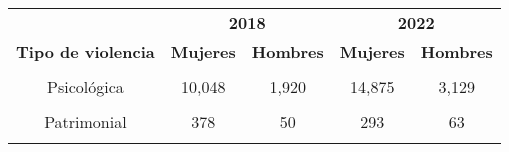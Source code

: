 \begin{tabular}[t]{ccccc}
\toprule
\multicolumn{1}{c}{\textbf{ }} & \multicolumn{2}{c}{\textbf{2018}} & \multicolumn{2}{c}{\textbf{2022}} \\
\cmidrule(l{3pt}r{3pt}){2-3} \cmidrule(l{3pt}r{3pt}){4-5}
\textbf{Tipo de violencia} & \textbf{Mujeres} & \textbf{Hombres} & \textbf{Mujeres} & \textbf{Hombres}\\
\midrule
\cellcolor[HTML]{B6B3FF}{Física} & \cellcolor[HTML]{B6B3FF}{3,178} & \cellcolor[HTML]{B6B3FF}{305} & \cellcolor[HTML]{B6B3FF}{3,247} & \cellcolor[HTML]{B6B3FF}{488}\\
Psicológica & 10,048 & 1,920 & 14,875 & 3,129\\
\cellcolor[HTML]{B6B3FF}{Sexual} & \cellcolor[HTML]{B6B3FF}{119} & \cellcolor[HTML]{B6B3FF}{6} & \cellcolor[HTML]{B6B3FF}{75} & \cellcolor[HTML]{B6B3FF}{14}\\
Patrimonial & 378 & 50 & 293 & 63\\
\cellcolor[HTML]{B6B3FF}{Otras y sus combinaciones} & \cellcolor[HTML]{B6B3FF}{12531} & \cellcolor[HTML]{B6B3FF}{1,457} & \cellcolor[HTML]{B6B3FF}{13,248} & \cellcolor[HTML]{B6B3FF}{1,762}\\
\bottomrule
\end{tabular}
